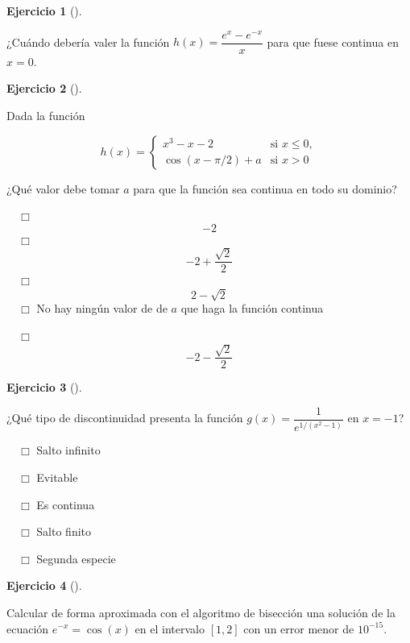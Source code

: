 \documentclass[
  a4paper,
]{scrreport}
\theoremstyle{definition}
\newtheorem{exercise}{Ejercicio}[chapter]
\theoremstyle{remark}
\begin{document}
\leavevmode{}%
\begin{exercise}[]\label{exr-discontinuidad-evitable}

¿Cuándo debería valer la función \(h(x)=\dfrac{e^x-e^{-x}}{x}\) para que
fuese continua en \(x=0\).

\vspace{18pt}

\end{exercise}

\leavevmode{}%
\begin{exercise}[]\label{exr-continuidad-2}

Dada la función

\[
h(x)=
\begin{cases}
x^3-x-2 & \mbox{si } x\leq 0,\\
\cos(x-\pi/2)+a & \mbox{si } x>0
\end{cases}
\]

¿Qué valor debe tomar \(a\) para que la función sea continua en todo su
dominio?

${\quad\Box}$ $$-2$$
${\quad\Box}$ $$-2+\frac{\sqrt{2}}{2}$$
${\quad\Box}$ $$2-\sqrt{2}$$
${\quad\Box}$ No hay ningún valor de de $a$ que haga la función continua

${\quad\Box}$ $$-2 - \frac{\sqrt{2}}{2}$$

\end{exercise}

\leavevmode{}%
\begin{exercise}[]\label{exr-clasificacion-discontinuidad}

¿Qué tipo de discontinuidad presenta la función
\(g(x)=\dfrac{1}{e^{1/(x^2-1)}}\) en \(x=-1\)?

${\quad\Box}$ Salto infinito

${\quad\Box}$ Evitable

${\quad\Box}$ Es continua

${\quad\Box}$ Salto finito

${\quad\Box}$ Segunda especie

\end{exercise}

\leavevmode{}%
\begin{exercise}[]\label{exr-raices}

Calcular de forma aproximada con el algoritmo de bisección una solución
de la ecuación \(e^{-x}=\cos(x)\) en el intervalo \([1,2]\) con un error
menor de \(10^{-15}\).

\vspace{18pt}

\end{exercise}
\end{document}
